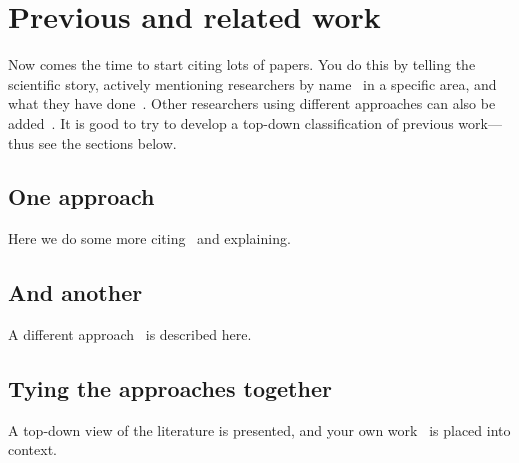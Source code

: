 \section{Previous and related work}

Now comes the time to start citing lots of papers. You do this
by telling the scientific story, actively mentioning researchers
by name~\cite{Bloggs, Bill, Barney} in a specific area, and what they
have done~\cite{Sim}. Other researchers using different approaches can
also be added~\cite{Smith, Jones}. It is good to try to develop a top-down
classification of previous work---thus see the sections below.

\subsection{One approach}

Here we do some more citing~\cite{Wilbur, Jim} and explaining.

\subsection{And another}

A different approach~\cite{Megg, Lee} is described here.

\subsection{Tying the approaches together}

A top-down view of the literature is presented, and your own
work~\cite{Me1, Me2} is placed into context.

